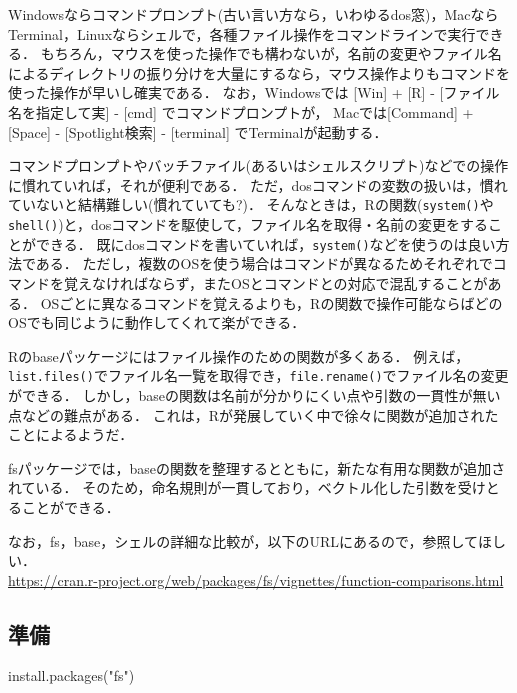 \documentclass[
]{article}
\newenvironment{Shaded}{\begin{snugshade}}{\end{snugshade}}
\newcommand{\FunctionTok}[1]{\textcolor[rgb]{0.00,0.00,0.00}{#1}}
\newcommand{\NormalTok}[1]{#1}
\newcommand{\StringTok}[1]{\textcolor[rgb]{0.31,0.60,0.02}{#1}}
\begin{document}
Windowsならコマンドプロンプト(古い言い方なら，いわゆるdos窓)，MacならTerminal，Linuxならシェルで，各種ファイル操作をコマンドラインで実行できる．
もちろん，マウスを使った操作でも構わないが，名前の変更やファイル名によるディレクトリの振り分けを大量にするなら，マウス操作よりもコマンドを使った操作が早いし確実である．
なお，Windowsでは {[}Win{]} + {[}R{]} - {[}ファイル名を指定して実{]} - {[}cmd{]} でコマンドプロンプトが，
Macでは{[}Command{]} + {[}Space{]} - {[}Spotlight検索{]} - {[}terminal{]} でTerminalが起動する．

コマンドプロンプトやバッチファイル(あるいはシェルスクリプト)などでの操作に慣れていれば，それが便利である．
ただ，dosコマンドの変数の扱いは，慣れていないと結構難しい(慣れていても?)．
そんなときは，Rの関数(\texttt{system()}や\texttt{shell()})と，dosコマンドを駆使して，ファイル名を取得・名前の変更をすることができる．
既にdosコマンドを書いていれば，\texttt{system()}などを使うのは良い方法である．
ただし，複数のOSを使う場合はコマンドが異なるためそれぞれでコマンドを覚えなければならず，またOSとコマンドとの対応で混乱することがある．
OSごとに異なるコマンドを覚えるよりも，Rの関数で操作可能ならばどのOSでも同じように動作してくれて楽ができる．

Rのbaseパッケージにはファイル操作のための関数が多くある．
例えば，\texttt{list.files()}でファイル名一覧を取得でき，\texttt{file.rename()}でファイル名の変更ができる．
しかし，baseの関数は名前が分かりにくい点や引数の一貫性が無い点などの難点がある．
これは，Rが発展していく中で徐々に関数が追加されたことによるようだ．

fsパッケージでは，baseの関数を整理するとともに，新たな有用な関数が追加されている．
そのため，命名規則が一貫しており，ベクトル化した引数を受けとることができる．

なお，fs，base，シェルの詳細な比較が，以下のURLにあるので，参照してほしい．\\
\url{https://cran.r-project.org/web/packages/fs/vignettes/function-comparisons.html}

\hypertarget{ux6e96ux5099-3}{%
\subsection{準備}\label{ux6e96ux5099-3}}

\begin{Shaded}
\begin{Highlighting}[]
\FunctionTok{install.packages}\NormalTok{(}\StringTok{"fs"}\NormalTok{)}
\end{Highlighting}
\end{Shaded}
\end{document}
